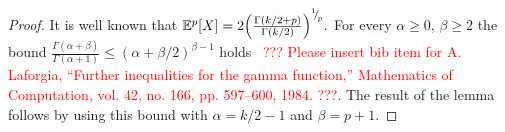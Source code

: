 \begin{proof}
It is well known that
    $
        \mathbb{E}^{p}[X] = 2 \Big( \frac{\Gamma(k/2+p)}{\Gamma(k/2)} \Big)^{{}^{1}{\mskip -5mu/\mskip -3mu}_{p}}.
    $ For every $\alpha \ge 0$, $\beta \ge 2$ the bound $\frac{\Gamma(\alpha+\beta)}{\Gamma(\alpha + 1)} \le (\alpha+\beta/2)^{\beta-1}$ holds~\cite[Eqn (2.2)]{LaForgia1984} \textcolor{red}{??? Please insert bib item for A. Laforgia, “Further inequalities for the gamma function,” Mathematics of Computation, vol. 42, no.
166, pp. 597–600, 1984. ???}. The result of the lemma follows by using this bound with $\alpha = k/2-1$ and $\beta = p+1$.

\end{proof}
